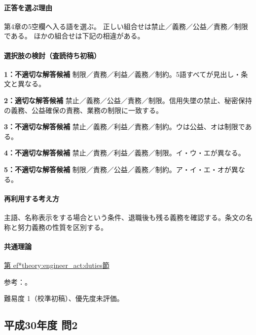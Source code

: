 \paragraph{正答を選ぶ理由} 第4章の5空欄へ入る語を選ぶ。 正しい組合せは禁止／義務／公益／責務／制限である。 ほかの組合せは下記の相違がある。

\paragraph{選択肢の検討（査読待ち初稿）}

\noindent\textbf{1：不適切な解答候補} 制限／責務／利益／義務／制約。5語すべてが見出し・条文と異なる。\par

\noindent\textbf{2：適切な解答候補} 禁止／義務／公益／責務／制限。信用失墜の禁止、秘密保持の義務、公益確保の責務、業務の制限に一致する。\par

\noindent\textbf{3：不適切な解答候補} 禁止／義務／利益／責務／制約。ウは公益、オは制限である。\par

\noindent\textbf{4：不適切な解答候補} 禁止／責務／利益／義務／制限。イ・ウ・エが異なる。\par

\noindent\textbf{5：不適切な解答候補} 制限／責務／公益／義務／制約。ア・イ・エ・オが異なる。\par

\paragraph{再利用する考え方} 主語、名称表示をする場合という条件、退職後も残る義務を確認する。条文の名称と努力義務の性質を区別する。

\paragraph{共通理論} \hyperref[theory:engineer_act:duties]{第
ef*{theory:engineer_act:duties}節}

\par 参考：\cite{engineer_act_current}。

\par 難易度 1（校準初稿）、優先度未評価。

\subsection{平成30年度 問2}
\label{q:h30-reg-apt-02}

